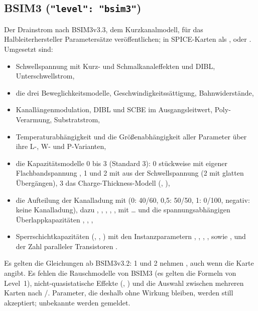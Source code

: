 \subsection{BSIM3 (\texttt{"level": "bsim3"})}

Der Drainstrom nach BSIM3v3.3, dem Kurzkanalmodell, für das
Halbleiterhersteller Parametersätze veröffentlichen; in SPICE-Karten als
,  oder . Umgesetzt sind:

\begin{itemize}
  \item Schwellspannung mit Kurz- und Schmalkanaleffekten und DIBL,
    Unterschwellstrom,
  \item die drei Beweglichkeitsmodelle, Geschwindigkeitssättigung,
    Bahnwiderstände,
  \item Kanallängenmodulation, DIBL und SCBE im Ausgangsleitwert,
    Poly-Verarmung, Substratstrom,
  \item Temperaturabhängigkeit und die Größenabhängigkeit aller Parameter
    über ihre L-, W- und P-Varianten,
  \item die Kapazitätsmodelle  0 bis 3 (Standard 3): 0
    stückweise mit eigener Flachbandspannung , 1 und 2 mit
     aus der Schwellspannung (2 mit glatten Übergängen), 3 das
    Charge-Thickness-Modell (, ),
  \item die Aufteilung der Kanalladung mit  (0: 40/60, 0,5:
    50/50, 1: 0/100, negativ: keine Kanalladung), dazu ,
    , , , ,  mit
     \dots{}  und die spannungsabhängigen
    Überlappkapazitäten , , ,
  \item Sperrschichtkapazitäten (, , ) mit
    den Instanzparametern , , , , sowie
    ,  und der Zahl paralleler Transistoren .
\end{itemize}

Es gelten die Gleichungen ab BSIM3v3.2:  1 und 2 nehmen
, auch wenn die Karte  angibt. Es fehlen die
Rauschmodelle von BSIM3 (es gelten die Formeln von Level~1),
nicht-quasistatische Effekte (, ) und die Auswahl
zwischen mehreren Karten nach /. Parameter, die
deshalb ohne Wirkung bleiben, werden still akzeptiert; unbekannte werden
gemeldet.

